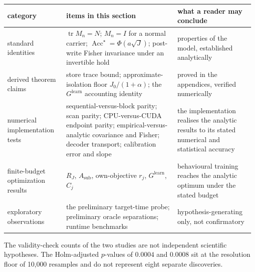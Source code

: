 \documentclass[
  10pt,
]{article}
\newcounter{none} %
\begin{document}
{\def\LTcaptype{none} %
\begin{longtable}[]{@{}
  >{\raggedright\arraybackslash}p{}
  >{\raggedright\arraybackslash}p{}
  >{\raggedright\arraybackslash}p{}@{}}
\toprule\noalign{}
\begin{minipage}[b]{\linewidth}\raggedright
category
\end{minipage} & \begin{minipage}[b]{\linewidth}\raggedright
items in this section
\end{minipage} & \begin{minipage}[b]{\linewidth}\raggedright
what a reader may conclude
\end{minipage} \\
\midrule\noalign{}
\endhead
\bottomrule\noalign{}
\endlastfoot
standard identities & \(\operatorname{tr}M_n=N\); \(M_n=I\) for a normal
carrier; \(\operatorname{Acc}^\star=\Phi(a\sqrt J)\); post-write Fisher
invariance under an invertible hold & properties of the model,
established analytically \\
derived theorem claims & store trace bound; approximate-isolation floor
\(J_0/(1+\alpha)\); the \(G^{\text{learn}}\) accounting identity &
proved in the appendices, verified numerically \\
numerical implementation tests & sequential-versus-block parity; scan
parity; CPU-versus-CUDA endpoint parity; empirical-versus-analytic
covariance and Fisher; decoder transport; calibration error and slope &
the implementation realises the analytic results to its stated numerical
and statistical accuracy \\
finite-budget optimization results & \(R_J\), \(A_{\text{sub}}\),
own-objective \(r_j\), \(G^{\text{learn}}\), \(C_j\) & behavioural
training reaches the analytic optimum under the stated budget \\
exploratory observations & the preliminary target-time probe;
preliminary oracle separations; runtime benchmarks &
hypothesis-generating only, not confirmatory \\
\end{longtable}
}

The validity-check counts of the two studies are not independent
scientific hypotheses. The Holm-adjusted \(p\)-values of \(0.0004\) and
\(0.0008\) sit at the resolution floor of 10,000 resamples and do not
represent eight separate discoveries.
\end{document}
